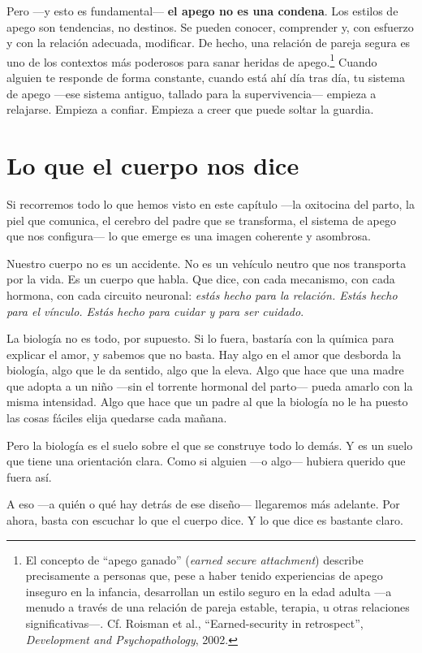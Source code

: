 Pero ---y esto es fundamental--- \textbf{el apego no es una condena}. Los estilos de apego son tendencias, no destinos. Se pueden conocer, comprender y, con esfuerzo y con la relación adecuada, modificar. De hecho, una relación de pareja segura es uno de los contextos más poderosos para sanar heridas de apego.\footnote{El concepto de ``apego ganado'' (\textit{earned secure attachment}) describe precisamente a personas que, pese a haber tenido experiencias de apego inseguro en la infancia, desarrollan un estilo seguro en la edad adulta ---a menudo a través de una relación de pareja estable, terapia, u otras relaciones significativas---. Cf. Roisman et al., ``Earned-security in retrospect'', \textit{Development and Psychopathology}, 2002.} Cuando alguien te responde de forma constante, cuando está ahí día tras día, tu sistema de apego ---ese sistema antiguo, tallado para la supervivencia--- empieza a relajarse. Empieza a confiar. Empieza a creer que puede soltar la guardia.

\section{Lo que el cuerpo nos dice}

Si recorremos todo lo que hemos visto en este capítulo ---la oxitocina del parto, la piel que comunica, el cerebro del padre que se transforma, el sistema de apego que nos configura--- lo que emerge es una imagen coherente y asombrosa.

Nuestro cuerpo no es un accidente. No es un vehículo neutro que nos transporta por la vida. Es un cuerpo que habla. Que dice, con cada mecanismo, con cada hormona, con cada circuito neuronal: \textit{estás hecho para la relación. Estás hecho para el vínculo. Estás hecho para cuidar y para ser cuidado}.

La biología no es todo, por supuesto. Si lo fuera, bastaría con la química para explicar el amor, y sabemos que no basta. Hay algo en el amor que desborda la biología, algo que le da sentido, algo que la eleva. Algo que hace que una madre que adopta a un niño ---sin el torrente hormonal del parto--- pueda amarlo con la misma intensidad. Algo que hace que un padre al que la biología no le ha puesto las cosas fáciles elija quedarse cada mañana.

Pero la biología es el suelo sobre el que se construye todo lo demás. Y es un suelo que tiene una orientación clara. Como si alguien ---o algo--- hubiera querido que fuera así.

A eso ---a quién o qué hay detrás de ese diseño--- llegaremos más adelante. Por ahora, basta con escuchar lo que el cuerpo dice. Y lo que dice es bastante claro.

